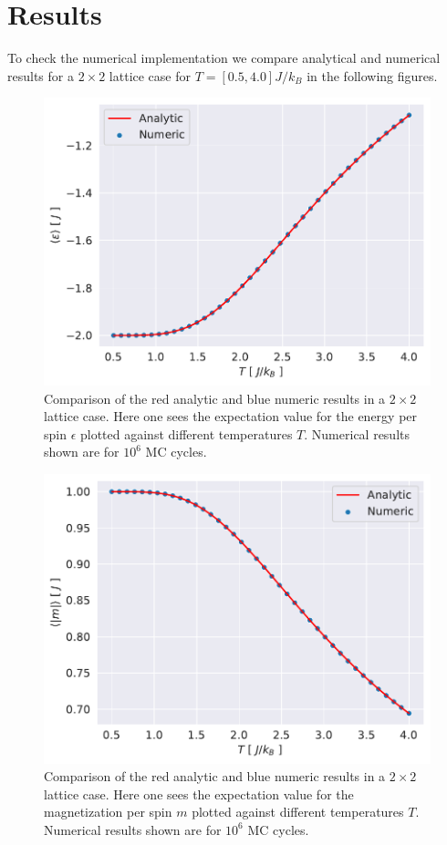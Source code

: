 \documentclass[english,notitlepage,reprint,nofootinbib]{revtex4-1}  %
\begin{document}
\section{Results}\label{sec:results}
To check the numerical implementation we compare analytical and numerical results for a $2\times2$ lattice case for $T=[0.5,4.0]J/k_B$ in the following figures.

\begin{figure}[H]
    \centering
    \includegraphics[width=.5\textwidth]{../figures/numeric_analytic_e_T.pdf}
    \caption{Comparison of the red analytic and blue numeric results in a $2\times2$ lattice case. Here one sees the expectation value for the energy per spin $\epsilon$ plotted against different temperatures $T$. Numerical results shown are for $10^6$ MC cycles.}
    \label{fig:numeric_analytic_e_T}
\end{figure}

\begin{figure}[H]
    \centering
    \includegraphics[width=.5\textwidth]{../figures/numeric_analytic_m_T.pdf}
    \caption{Comparison of the red analytic and blue numeric results in a $2\times2$ lattice case. Here one sees the expectation value for the magnetization per spin $m$ plotted against different temperatures $T$. Numerical results shown are for $10^6$ MC cycles.}
    \label{fig:numeric_analytic_m_T}
\end{figure}
\end{document}
